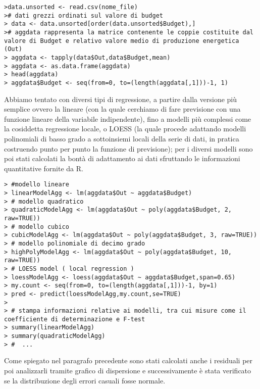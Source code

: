\documentclass[12pt,a4paper,openright,twoside]{report}
\begin{document}
\begin{lstlisting}
>data.unsorted <- read.csv(nome_file)
># dati grezzi ordinati sul valore di budget
> data <- data.unsorted[order(data.unsorted$Budget),]
># aggdata rappresenta la matrice contenente le coppie costituite dal valore di Budget e relativo valore medio di produzione energetica (Out)
> aggdata <- tapply(data$Out,data$Budget,mean)
> aggdata <- as.data.frame(aggdata)  
> head(aggdata)
> aggdata$Budget <- seq(from=0, to=(length(aggdata[,1]))-1, 1)
\end{lstlisting}
 
Abbiamo tentato con diversi tipi di regressione, a partire dalla versione più semplice ovvero la lineare (con la quale cerchiamo di fare previsione con una funzione lineare della variabile indipendente), fino a modelli più complessi come la cosiddetta regressione locale, o LOESS (la quale procede adattando modelli polinomiali di basso grado a sottoinsiemi locali della serie di dati, in pratica costruendo punto per punto la funzione di previsione); per i diversi modelli sono poi stati calcolati la bontà di adattamento ai dati sfruttando le informazioni quantitative fornite da R.

\begin{lstlisting}
> #modello lineare
> linearModelAgg <- lm(aggdata$Out ~ aggdata$Budget)
> # modello quadratico
> quadraticModelAgg <- lm(aggdata$Out ~ poly(aggdata$Budget, 2, raw=TRUE))
> # modello cubico
> cubicModelAgg <- lm(aggdata$Out ~ poly(aggdata$Budget, 3, raw=TRUE))
> # modello polinomiale di decimo grado
> highPolyModelAgg <- lm(aggdata$Out ~ poly(aggdata$Budget, 10, raw=TRUE))
> # LOESS model ( local regression )
> loessModelAgg <- loess(aggdata$Out ~ aggdata$Budget,span=0.65)
> my.count <- seq(from=0, to=(length(aggdata[,1]))-1, by=1)
> pred <- predict(loessModelAgg,my.count,se=TRUE)
>
> # stampa informazioni relative ai modelli, tra cui misure come il coefficiente di determinazione e F-test
> summary(linearModelAgg)
> summary(quadraticModelAgg)
> #  ... 
\end{lstlisting}

Come spiegato nel paragrafo precedente sono stati calcolati anche i residuali per poi analizzarli tramite grafico di dispersione e successivamente è stata verificato se la distribuzione degli errori casuali fosse normale.
\end{document}
